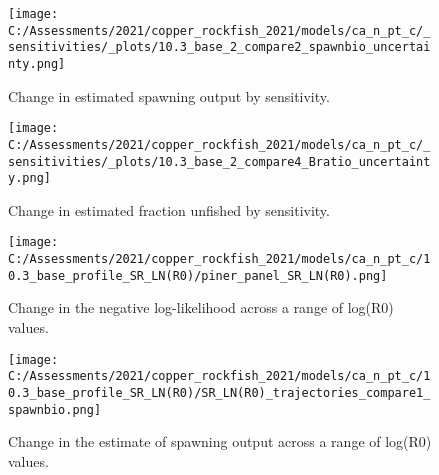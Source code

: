 \documentclass[11pt,
  english,
  a4paper,
]{article}
\begin{document}
\begin{figure}
\centering
\texttt{[image: C:/Assessments/2021/copper\_rockfish\_2021/models/ca\_n\_pt\_c/\_sensitivities/\_plots/10.3\_base\_2\_compare2\_spawnbio\_uncertainty.png]}
\caption{Change in estimated spawning output by sensitivity.\label{fig:sens-ssb-2}}
\end{figure}

\tagmcend\tagstructend


\begin{figure}
\centering
\texttt{[image: C:/Assessments/2021/copper\_rockfish\_2021/models/ca\_n\_pt\_c/\_sensitivities/\_plots/10.3\_base\_2\_compare4\_Bratio\_uncertainty.png]}
\caption{Change in estimated fraction unfished by sensitivity.\label{fig:sens-depl-2}}
\end{figure}

\tagmcend\tagstructend


\begin{figure}
\centering
\texttt{[image: C:/Assessments/2021/copper\_rockfish\_2021/models/ca\_n\_pt\_c/10.3\_base\_profile\_SR\_LN(R0)/piner\_panel\_SR\_LN(R0).png]}
\caption{Change in the negative log-likelihood across a range of log(R0) values.\label{fig:r0-profile}}
\end{figure}

\tagmcend\tagstructend


\begin{figure}
\centering
\texttt{[image: C:/Assessments/2021/copper\_rockfish\_2021/models/ca\_n\_pt\_c/10.3\_base\_profile\_SR\_LN(R0)/SR\_LN(R0)\_trajectories\_compare1\_spawnbio.png]}
\caption{Change in the estimate of spawning output across a range of log(R0) values.\label{fig:r0-ssb}}
\end{figure}

\tagmcend\tagstructend

\end{document}
